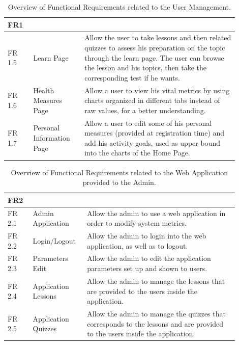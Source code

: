 \begin{table}[h!]
    \setstretch{\myspacing}
    \centering
    \begin{tabular}{|>{\raggedright\arraybackslash}p{0.1\linewidth}|>{\raggedright\arraybackslash}p{0.2\linewidth}|>{\raggedright\arraybackslash}p{0.6\linewidth}|}
        \hline
        \textbf{FR1} & \multicolumn{2}{>{\centering\arraybackslash}p{0.7\linewidth}|}{\textbf{User Management}} \\
        \hline
        FR 1.5 & Learn Page & Allow the user to take lessons and then related quizzes to assess his preparation on the topic through the learn page. The user can browse the lesson and his topics, then take the corresponding test if he wants. \\
        \hline
        FR 1.6 & Health Measures Page & Allow a user to view his vital metrics by using charts organized in different tabs instead of raw values, for a better understanding. \\
        \hline
        FR 1.7 & Personal Information Page & Allow a user to edit some of his personal measures (provided at registration time) and add his activity goals, used as upper bound into the charts of the Home Page. \\
        \hline
    \end{tabular}
    \caption{Overview of Functional Requirements related to the User Management.}
\end{table}

\begin{table}[h!]
    \setstretch{\myspacing}
    \centering
    \begin{tabular}{|>{\raggedright\arraybackslash}p{0.1\linewidth}|>{\raggedright\arraybackslash}p{0.2\linewidth}|>{\raggedright\arraybackslash}p{0.6\linewidth}|}
        \hline
        \textbf{FR2} & \multicolumn{2}{>{\centering\arraybackslash}p{0.7\linewidth}|}{\textbf{Admin Management}} \\
        \hline
        FR 2.1 & Admin Application & Allow the admin to use a web application in order to modify system metrics. \\
        \hline
        FR 2.2 & Login/Logout & Allow the admin to login into the web application, as well as to logout. \\
        \hline
        FR 2.3 & Parameters Edit & Allow the admin to edit the application parameters set up and shown to users. \\
        \hline
        FR 2.4 & Application Lessons & Allow the admin to manage the lessons that are provided to the users inside the application. \\
        \hline
        FR 2.5 & Application Quizzes & Allow the admin to manage the quizzes that corresponds to the lessons and are provided to the users inside the application. \\
        \hline
    \end{tabular}
    \caption{Overview of Functional Requirements related to the Web Application provided to the Admin.}
    \label{tab:fr2}
\end{table}

